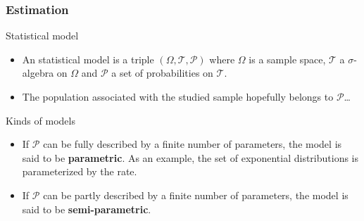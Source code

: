 \documentclass[main.tex]{subfiles}
\begin{document}
\begin{frame}
    \frametitle{Estimation}
\begin{block}{Statistical model}
   \begin{itemize}
    \item<+-> An statistical model is a triple $\left( \Omega, \mathcal{T}, \mathcal{P} \right)$ where $\Omega$ is a sample space,
    $\mathcal{T}$ a $\sigma$-algebra on $\Omega$ and $\mathcal{P}$ a set of probabilities on $\mathcal{T}.$
    \item<+-> The population associated with the studied sample hopefully belongs to $\mathcal{P}$\dots
   \end{itemize} 
\end{block}
\begin{block}{Kinds of models}
\begin{itemize}
    \item<+-> If $\mathcal{P}$ can be fully described by a finite number of parameters, the model is said to be \textbf{parametric}. As an example, 
    the set of exponential distributions is parameterized by the rate.
    \item<+-> If $\mathcal{P}$ can be partly described by a finite number of parameters, the model is said to be \textbf{semi-parametric}.
\end{itemize}    
\end{block}
    

\end{frame}
\end{document}
